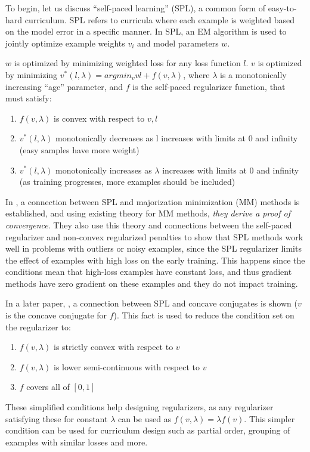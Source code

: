 \documentclass[letterpaper]{article}
\theoremstyle{definition}
\begin{document}
To begin, let us discuss ``self-paced learning'' (SPL), a common form of easy-to-hard curriculum.
SPL refers to curricula where each example is weighted based on the model error in a specific manner.
In SPL, an EM algorithm is used to jointly optimize example weights $v_i$ and model parameters $w$.

$w$ is optimized by minimizing weighted loss for any loss function $l$.
$v$ is optimized by minimizing $v^*(l,\lambda)=argmin_{v} vl + f(v, \lambda)$, where $\lambda$ is a monotonically increasing ``age'' parameter, and $f$ is the self-paced regularizer function, that must satisfy:
\begin{enumerate}
	\item $f(v, \lambda)$ is convex with respect to $v, l$
	\item $v^*(l,\lambda)$ monotonically decreases as l increases with limits at 0 and infinity (easy samples have more weight)
	\item $v^*(l,\lambda)$ monotonically increases as $\lambda$ increases with limits at 0 and infinity (as training progresses, more examples should be included)
\end{enumerate}

In \cite{Meng2017}, a connection between SPL and majorization minimization (MM) methods is established, and using existing theory for MM methods, \emph{they derive a proof of convergence}. They also use this theory and connections between the self-paced regularizer and non-convex regularized penalties to show that SPL methods work well in problems with outliers or noisy examples, since the SPL regularizer limits the effect of examples with high loss on the early training. This happens since the conditions mean that high-loss examples have constant loss, and thus gradient methods have zero gradient on these examples and they do not impact training.

In a later paper, \cite{Liu2018}, a connection between SPL and concave conjugates is shown ($v$ is the concave conjugate for $f$).
This fact is used to reduce the condition set on the regularizer to:
\begin{enumerate}
	\item $f(v, \lambda)$ is strictly convex with respect to $v$
	\item $f(v, \lambda)$ is lower semi-continuous with respect to $v$
	\item $f$ covers all of $[0,1]$
\end{enumerate}
These simplified conditions help designing regularizers, as any regularizer satisfying these for constant $\lambda$ can be used as $f(v, \lambda)=\lambda f(v)$. This simpler condition can be used for curriculum design such as partial order, grouping of examples with similar losses and more.
\end{document}
